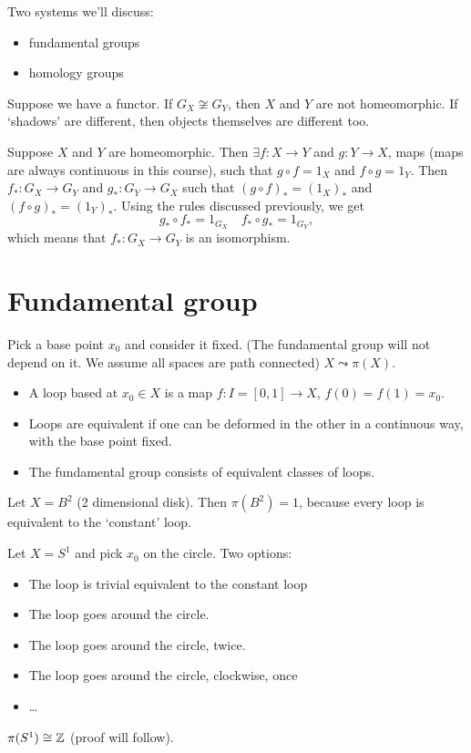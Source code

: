 Two systems we'll discuss:
\begin{itemize}
    \item fundamental groups
    \item homology groups
\end{itemize}


\begin{eg}
    Suppose we have a functor.
    If $G_X \not\cong G_Y$, then  $X$ and  $Y$ are not homeomorphic.
    If `shadows' are different, then objects themselves are different too.
\end{eg}
\begin{explanation}
    Suppose $X$ and $Y$ are homeomorphic.
    Then $\exists f: X \to  Y$ and $g: Y \to  X$, maps (maps are always continuous in this course), such that $g  \circ f = 1_X$ and $f \circ g = 1_Y$.
    Then $f_*: G_X \to G_Y$ and $g_*: G_Y \to  G_X$ such that $(g \circ f)_* = (1_X)_*$ and  $(f \circ g)_* = (1_Y)_*$. Using the rules discussed previously, we get
    \[
    g_*  \circ f_* = 1_{G_X} \quad f_*  \circ  g_* = 1_{G_Y}
    ,\] 
    which means that $f_* : G_X \to  G_Y$ is an isomorphism.
\end{explanation}

\section{Fundamental group}
Pick a base point $x_0$ and consider it fixed. (The fundamental group will not depend on it. We assume all spaces are path connected)
$X \leadsto \pi(X)$.
\begin{itemize}
    \item A loop based at $x_0 \in X$ is a map $f: I = [0, 1] \to X$, $f(0) = f(1) = x_0$.
    \item Loops are equivalent if one can be deformed in the other in a continuous way, with the base point fixed.
    \item The fundamental group consists of equivalent classes of loops.
\end{itemize}

\begin{eg}
    Let $X = B^2$ (2 dimensional disk).
    Then $\pi(B^2) = 1$, because every loop is equivalent to the `constant' loop.
\end{eg}
\begin{eg}
    Let $X = S^{1}$ and pick $x_0$ on the circle.
    Two options: 
    \begin{itemize}
        \item The loop is trivial equivalent to the constant loop
        \item The loop goes around the circle.
        \item The loop goes around the circle, twice.
        \item The loop goes around the circle, clockwise, once
        \item \ldots
    \end{itemize}
    $\pi(S^{1}) \cong \mathbb{Z}$ (proof will follow).
\end{eg}

